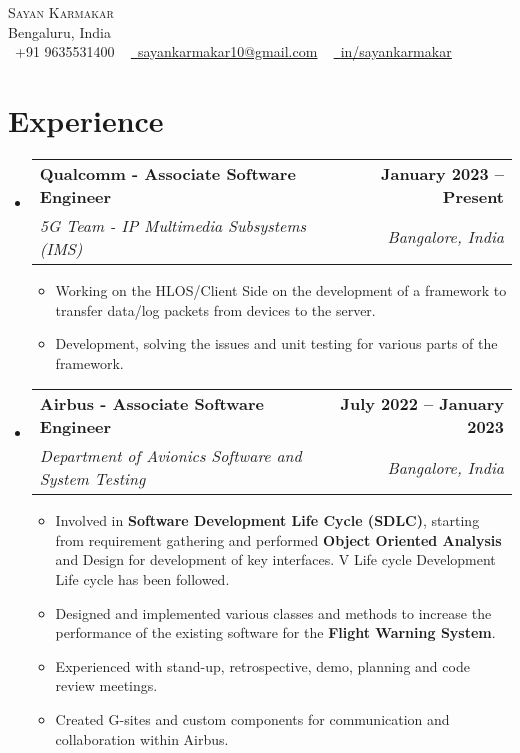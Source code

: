 \documentclass[letterpaper,11pt]{article}
\makeatletter
\newcommand{\resumeItem}[1]{
  \item\small{
    {#1 \vspace{-2pt}}
  }
}
\newcommand{\resumeSubheading}[4]{
  \vspace{-2pt}\item
    \begin{tabular*}{1.0\textwidth}[t]{l@{\extracolsep{\fill}}r}
      \textbf{#1} & \textbf{\small #2} \\
      \textit{\small#3} & \textit{\small #4} \\
    \end{tabular*}\vspace{-7pt}
}
\newcommand{\resumeSubHeadingListStart}{\begin{itemize}[leftmargin=0.0in, label={}]}
\newcommand{\resumeSubHeadingListEnd}{\end{itemize}}
\newcommand{\resumeItemListStart}{\begin{itemize}}
\newcommand{\resumeItemListEnd}{\end{itemize}\vspace{-5pt}}
\makeatother
\begin{document}
%

\begin{center}
    {\Huge \scshape \color{qccolor} {Sayan Karmakar}} \\ \vspace{1pt}
    Bengaluru, India \\ \vspace{1pt}
    \small \raisebox{-0.1\height}\faPhone\ +91 9635531400 ~ \href{mailto:sayankarmakar10@gmail.com}{\raisebox{-0.2\height}\faEnvelope\  \underline{sayankarmakar10@gmail.com}} ~
    \href{https://www.linkedin.com/in/sayankarmakar/}{\raisebox{-0.2\height}\faLinkedin\ \underline{in/sayankarmakar}} ~
    \vspace{-8pt}
\end{center}



\section{Experience}
  \resumeSubHeadingListStart
    \resumeSubheading
      {Qualcomm - Associate Software Engineer }{January 2023 -- Present}
      {5G Team - IP Multimedia Subsystems (IMS)}{Bangalore, India}
      \resumeItemListStart
      \resumeItem{Working on the HLOS/Client Side on the development of a framework to transfer data/log packets from devices \newline to the server.}
      \resumeItem{Development, solving the issues and unit testing for various parts of the framework.}
      \resumeItemListEnd
     \resumeSubheading
      {Airbus - Associate Software Engineer }{July 2022 -- January 2023}
      {Department of Avionics Software and System Testing}{Bangalore, India}
      \resumeItemListStart
        \resumeItem{Involved in \textbf{Software Development Life Cycle (SDLC)}, starting from requirement gathering and performed \newline \textbf{Object Oriented Analysis} and Design for development of key interfaces. V Life cycle Development Life cycle \newline has been followed.}
        \resumeItem{Designed and implemented various classes and methods to increase the performance of the existing software for the \textbf{Flight Warning System}.}
        \resumeItem{Experienced with stand-up, retrospective, demo, planning and code review meetings.}
        \resumeItem{Created G-sites and custom components for communication and collaboration within Airbus.}
    \resumeItemListEnd
  \resumeSubHeadingListEnd
\vspace{-16pt}
\end{document}

